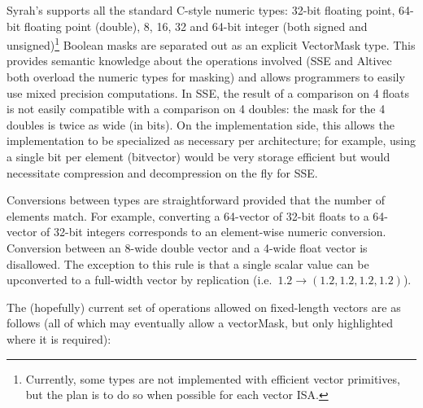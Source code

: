 \documentclass[11pt]{amsart}
\begin{document}
Syrah's supports all the standard C-style numeric types: 32-bit
floating point, 64-bit floating point (double), 8, 16, 32 and 64-bit
integer (both signed and unsigned)\footnote{Currently, some types are
  not implemented with efficient vector primitives, but the plan is to
  do so when possible for each vector ISA.} Boolean masks are
separated out as an explicit VectorMask type. This provides semantic
knowledge about the operations involved (SSE and Altivec both overload
the numeric types for masking) and allows programmers to easily use
mixed precision computations. In SSE, the result of a comparison on 4
floats is not easily compatible with a comparison on 4 doubles: the
mask for the 4 doubles is twice as wide (in bits).  On the
implementation side, this allows the implementation to be specialized
as necessary per architecture; for example, using a single bit per
element (bitvector) would be very storage efficient but would
necessitate compression and decompression on the fly for SSE.

Conversions between types are straightforward provided that the number
of elements match. For example, converting a 64-vector of 32-bit floats
to a 64-vector of 32-bit integers corresponds to an element-wise numeric
conversion. Conversion between an 8-wide double vector and a 4-wide
float vector is disallowed. The exception to this rule is that a
single scalar value can be upconverted to a full-width vector by
replication (i.e.\ $1.2 \rightarrow (1.2, 1.2, 1.2, 1.2)$).

The (hopefully) current set of operations allowed on fixed-length
vectors are as follows (all of which may eventually allow a
vectorMask, but only highlighted where it is required):
\newpage
\end{document}
